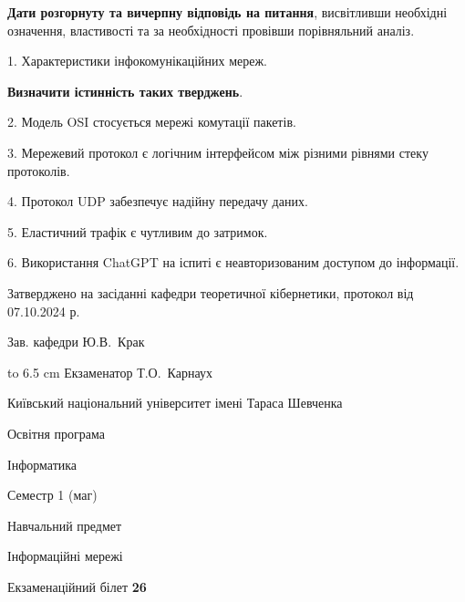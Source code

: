 \documentclass[12pt, ukrainian]{article}
\begin{document}
{
\qquad\textbf{Дати розгорнуту та вичерпну відповідь на питання}, висвітливши необхідні означення, властивості та за необхідності провівши порівняльний аналіз.

1. Характеристики інфокомунікаційних мереж.



\qquad\textbf{Визначити істинність таких тверджень}.

2. Модель OSI стосується мережі комутації пакетів.


3. Мережевий протокол є логічним інтерфейсом між різними рівнями стеку протоколів.


4. Протокол UDP забезпечує надійну передачу даних.


5. Еластичний трафік є чутливим до затримок.


6. Використання ChatGPT на іспиті є неавторизованим доступом до інформації.

}
{\smallskip\smallskip \begin {scriptsize} Затверджено на засіданні кафедри теоретичної кібернетики, протокол   від   07.10.2024 р.\par\smallskip\smallskip\smallskip\smallskip
{\parbox {6.5 cm} {Зав. кафедри \dotfill Ю.В.~Крак}}\hspace {0.7cm} {\hbox to 6.5 cm { Екзаменатор \dotfill Т.О.~Карнаух}} \end{scriptsize}}
\vspace{0.9cm}
{{\begin {scriptsize}\par
{ \center  Київський національний університет імені Тараса Шевченка \par}
{\parbox {5 cm}{Освітня програма \hfill}{\parbox {7 cm}{Інформатика\hfill}}\parbox {6 cm}{\hfill Семестр 1 (маг)}}\par
{\parbox {5 cm} {Навчальний предмет \hfill}\parbox {7 cm}{Інформаційні мережі \hfill}\parbox {6cm}{\hfill}\par}\vspace{-15pt} \end{scriptsize}}{\center Екзаменаційний білет \No \textbf { 26 }\par}}
\end{document}

